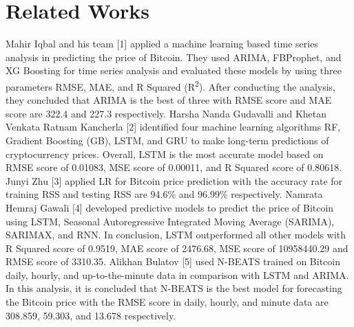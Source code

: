 \documentclass{ieeeojies}
\begin{document}
\section{Related Works}
Mahir Iqbal and his team [1] applied a machine learning based time series analysis in predicting the price of Bitcoin. They used ARIMA, FBProphet, and XG Boosting for time series analysis and evaluated these models by using three parameters RMSE, MAE, and R Squared (R\textsuperscript{2}). After conducting the analysis, they concluded that ARIMA is the best of three with RMSE score and MAE score are 322.4 and 227.3 respectively.\newline
Harsha Nanda Gudavalli and Khetan Venkata Ratnam Kancherla [2] identified four machine learning algorithms RF, Gradient Boosting (GB), LSTM, and GRU to make long-term predictions of cryptocurrency prices. Overall, LSTM is the most accurate model based on RMSE score of 0.01083, MSE score of 0.00011, and R Squared score of 0.80618.\newline
Junyi Zhu [3] applied LR for Bitcoin price prediction with the accuracy rate for training RSS and testing RSS are 94.6\% and 96.99\% respectively.\newline
Namrata Hemraj Gawali [4] developed predictive models to predict the price of Bitcoin using LSTM, Seasonal Autoregressive Integrated Moving Average (SARIMA), SARIMAX, and RNN. In conclusion, LSTM outperformed all other models with R Squared score of 0.9519, MAE score of 2476.68, MSE score of 10958440.29 and RMSE score of 3310.35.\newline
Alikhan Bulatov [5] used N-BEATS trained on Bitcoin daily, hourly, and up-to-the-minute data in comparison with LSTM and ARIMA. In this analysis, it is concluded that N-BEATS is the best model for forecasting the Bitcoin price with the RMSE score in daily, hourly, and minute data are 308.859, 59.303, and 13.678 respectively.
\EOD
\end{document}
